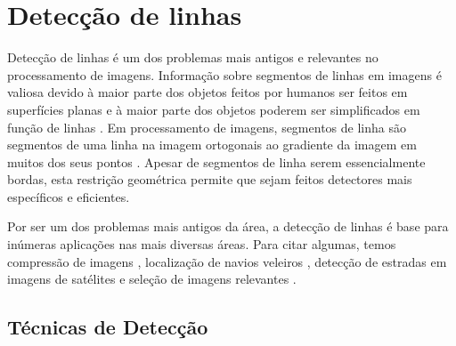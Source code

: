 \section{Detecção de linhas}




Detecção de linhas é um dos problemas mais antigos e relevantes no processamento de imagens. Informação sobre segmentos de linhas em imagens é valiosa devido à maior parte dos objetos feitos por humanos ser feitos em superfícies planas e à maior parte dos objetos poderem ser simplificados em função de linhas \cite{linha00}. Em processamento de imagens, segmentos de linha são segmentos de uma linha na imagem ortogonais ao gradiente da imagem em muitos dos seus pontos \cite{linha01}. Apesar de segmentos de linha serem essencialmente bordas, esta restrição geométrica permite que sejam feitos detectores mais específicos e eficientes.

Por ser um dos problemas mais antigos da área, a detecção de linhas é base para inúmeras aplicações nas mais diversas áreas. Para citar algumas, temos compressão de imagens \cite{linhacompress}, localização de navios veleiros \cite{linhanavio}, detecção de estradas em imagens de satélites \cite{linhasestrada} e seleção de imagens relevantes \cite{linhasselecao}.



\subsection{Técnicas de Detecção}

